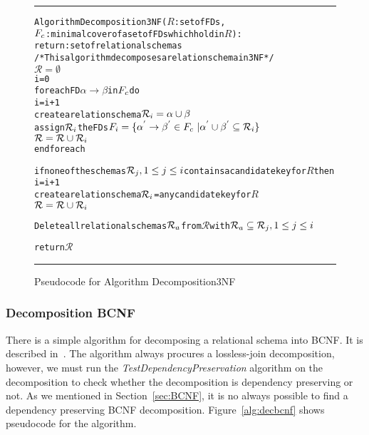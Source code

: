 \begin{figure}[htbp]
\hrule
\begin{alltt}
Algorithm Decomposition3NF(\(R\): set of FDs,
             \(F\sb{c}\): minimal cover of a set of FDs which hold in \(R\)):
          return: set of relational schemas  
/* This algorithm decomposes a relation schema in 3NF */
  \(\mathcal{R} = \emptyset\)
  i = 0
  foreach FD \(\alpha \rightarrow \beta\) in \(F\sb{c}\) do
    i = i + 1
    create a relation schema \(\mathcal{R}\sb{i} = \alpha \cup \beta\)
    assign \(\mathcal{R}\sb{i}\) the FDs  \(F\sb{i} = \{\alpha\sp{'} \rightarrow \beta\sp{'} \in F\sb{c}\ | \alpha\sp{'} \cup \beta\sp{'} \subseteq \mathcal{R}\sb{i}\}\)
    \(\mathcal{R} = \mathcal{R} \cup \mathcal{R}\sb{i}\)
  end foreach
  
  if none of the schemas \(\mathcal{R}\sb{j}, 1\leq{}j\leq{}i\) contains a candidate key for \(R\) then
    i = i + 1
    create a relation schema \(\mathcal{R}\sb{i}\) = any candidate key for \(R\)
    \(\mathcal{R} = \mathcal{R} \cup \mathcal{R}\sb{i}\)
    
  Delete all relational schemas \(\mathcal{R}\sb{a}\) from \(\mathcal{R}\) with \(\mathcal{R}\sb{a} \subseteq \mathcal{R}\sb{j},  1 \leq j \leq i\)
  
  return \(\mathcal{R}\)
\end{alltt}
\caption{Pseudocode for Algorithm Decomposition3NF}\label{alg:dec3nf}
\hrule
\end{figure}

\subsubsection{Decomposition BCNF}
There is a simple algorithm for decomposing a relational schema into BCNF.
It is described in~\cite[Section 6.9]{bdb2}. The algorithm always 
procures a lossless-join decomposition, however, we must run the 
\textit{TestDependencyPreservation} algorithm on
the decomposition to check whether the decomposition is dependency preserving or not. 
As we mentioned in Section~\ref{sec:BCNF},
it is no always possible to find a dependency preserving BCNF decomposition.
Figure~\ref{alg:decbcnf} shows pseudocode for the algorithm.

